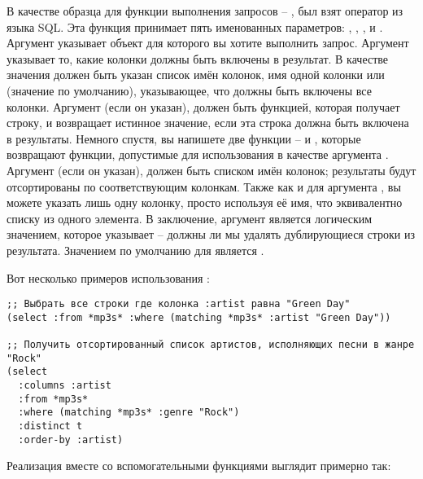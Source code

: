 В качестве образца для функции выполнения запросов --  , был взят оператор
 из языка SQL. Эта функция принимает пять именованных параметров:
, , ,  и .
Аргумент  указывает объект  для которого вы хотите выполнить
запрос.  Аргумент  указывает то, какие колонки должны быть включены в
результат.  В качестве значения должен быть указан список имён колонок, имя одной колонки
или  (значение по умолчанию), указывающее, что должны быть включены все колонки.
Аргумент  (если он указан), должен быть функцией, которая получает строку, и
возвращает истинное значение, если эта строка должна быть включена в результаты.  Немного
спустя, вы напишете две функции --  и , которые возвращают
функции, допустимые для использования в качестве аргумента .  Аргумент
 (если он указан), должен быть списком имён колонок; результаты будут
отсортированы по соответствующим колонкам.  Также как и для аргумента , вы
можете указать лишь одну колонку, просто используя её имя, что эквивалентно списку из
одного элемента.  В заключение, аргумент  является логическим значением,
которое указывает -- должны ли мы удалять дублирующиеся строки из результата.  Значением
по умолчанию для  является .

Вот несколько примеров использования :

\begin{lstlisting}
;; Выбрать все строки где колонка :artist равна "Green Day"
(select :from *mp3s* :where (matching *mp3s* :artist "Green Day"))

;; Получить отсортированный список артистов, исполняющих песни в жанре "Rock"
(select
  :columns :artist
  :from *mp3s*
  :where (matching *mp3s* :genre "Rock")
  :distinct t
  :order-by :artist)
\end{lstlisting}

Реализация  вместе со вспомогательными функциями выглядит примерно так:

